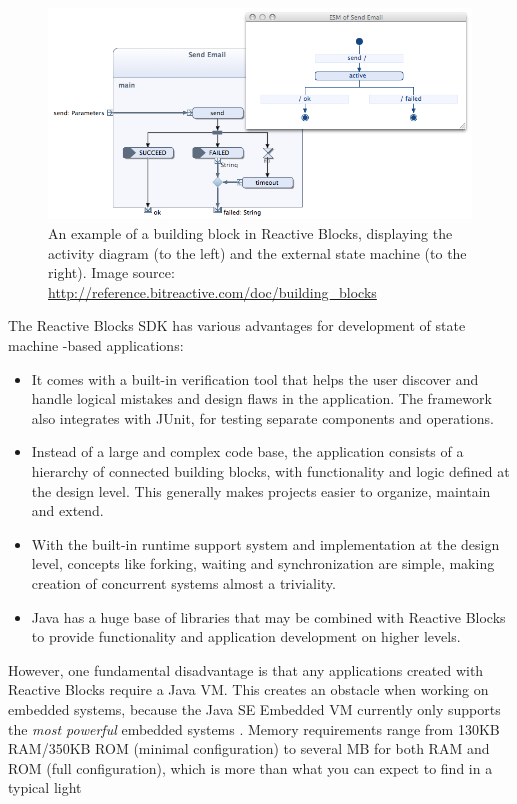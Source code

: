\begin{figure}[h]
	\centering
	\includegraphics[scale=0.5]{img/reactive_blocks.png}
	\caption[A building block in Reactive Blocks]{An example of a building block in Reactive Blocks, displaying the activity diagram (to the left) and the external state machine (to the right). Image source: \url{http://reference.bitreactive.com/doc/building_blocks} \label{figure:reactive_blocks} }
\end{figure}

The Reactive Blocks SDK has various advantages for development of state machine -based applications:
\begin{itemize}
	\item It comes with a built-in verification tool that helps the user discover and handle logical mistakes and design flaws in the application. The framework also integrates with JUnit, for testing separate components and operations.
	\item Instead of a large and complex code base, the application consists of a hierarchy of connected building blocks, with functionality and logic defined at the design level. This generally makes projects easier to organize, maintain and extend.
	\item With the built-in runtime support system and implementation at the design level, concepts like forking, waiting and synchronization are simple, making creation of concurrent systems almost a triviality.
	\item Java has a huge base of libraries that may be combined with Reactive Blocks to provide functionality and application development on higher levels.
\end{itemize}

However, one fundamental disadvantage is that any applications created with Reactive Blocks require a Java VM. This creates an obstacle when working on embedded systems, because the Java SE Embedded VM currently only supports the \textit{most powerful} embedded systems \cite{website:java_embedded_vm}. Memory requirements range from 130KB RAM/350KB ROM (minimal configuration) to several MB for both RAM and ROM (full configuration), which is more than what you can expect to find in a typical light

